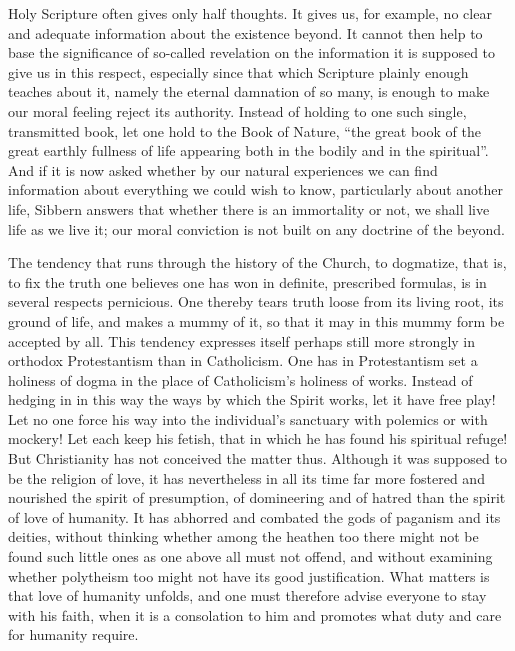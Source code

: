 \documentclass[12pt,a4paper,openany]{book}
\newcommand{\opage}[1]{\marginnote{\footnotesize\textit{[#1]}}}
\begin{document}
Holy Scripture often gives only half thoughts. It
gives us, for example, no clear and adequate information
about the existence beyond. It cannot then help to
base the significance of so-called revelation on the
information it is supposed to give us in this respect, especially since that
which Scripture plainly enough teaches about it, namely the eternal
damnation of so many, is enough to make our moral
feeling reject its authority. Instead of holding
\opage{96}to one such single, transmitted book, let one hold to
the Book of Nature, ``the great book of the great earthly fullness of life
appearing both in the bodily
and in the spiritual''. And if it is now asked whether by our natural experiences we can
find information about everything we could wish to know, particularly
about another life, Sibbern answers that whether there is
an immortality or not, we shall live life as we live
it; our moral conviction is not built on any
doctrine of the beyond.

The tendency that runs through the history of the Church, to
dogmatize, that is, to fix the truth one believes
one has won in definite, prescribed formulas, is in several
respects pernicious. One thereby tears truth loose
from its living root, its ground of life, and makes a mummy of
it, so that it may in this mummy form be
accepted by all. This tendency expresses itself perhaps still more strongly
in orthodox Protestantism than in Catholicism. One has
in Protestantism set a holiness of dogma in the place of
Catholicism's holiness of works. Instead of hedging in in this way
the ways by which the Spirit works, let it
have free play! Let no one force his way into the individual's
sanctuary with polemics or with mockery! Let each keep
his fetish, that in which he has found his spiritual refuge!
But Christianity has not conceived the matter thus. Although
it was supposed to be the religion of love, it has nevertheless in all
its time far more fostered and nourished the spirit of presumption,
of domineering and of hatred than the spirit of love of humanity.
It has abhorred and combated the gods of paganism and
its deities, without thinking whether among the heathen too
there might not be found such little ones as one above all
must not offend, and without examining whether
polytheism too might not have its good justification. What matters
is that love of humanity unfolds, and one
must therefore advise everyone to stay with his faith, when it
is a consolation to him and promotes what duty and
care for humanity require.
\end{document}
